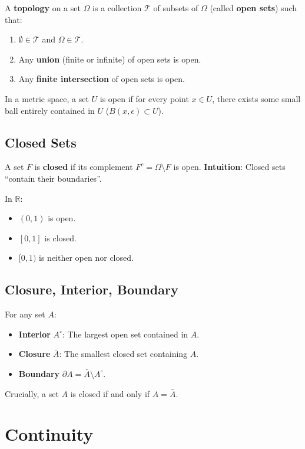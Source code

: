 \begin{definition}[Topology]
A \textbf{topology} on a set $\Omega$ is a collection $\mathcal{T}$ of subsets of $\Omega$ (called \textbf{open sets}) such that:
\begin{enumerate}
    \item $\emptyset \in \mathcal{T}$ and $\Omega \in \mathcal{T}$.
    \item Any \textbf{union} (finite or infinite) of open sets is open.
    \item Any \textbf{finite intersection} of open sets is open.
\end{enumerate}
\end{definition}

In a metric space, a set $U$ is open if for every point $x \in U$, there exists some small ball entirely contained in $U$ ($B(x, \epsilon) \subset U$).

\subsection{Closed Sets}
A set $F$ is \textbf{closed} if its complement $F^c = \Omega \setminus F$ is open.
\textbf{Intuition}: Closed sets ``contain their boundaries''.
\begin{example}
In $\mathbb{R}$:
\begin{itemize}
    \item $(0, 1)$ is open.
    \item $[0, 1]$ is closed.
    \item $[0, 1)$ is neither open nor closed.
\end{itemize}
\end{example}

\subsection{Closure, Interior, Boundary}
For any set $A$:
\begin{itemize}
    \item \textbf{Interior} $A^\circ$: The largest open set contained in $A$.
    \item \textbf{Closure} $\bar{A}$: The smallest closed set containing $A$.
    \item \textbf{Boundary} $\partial A = \bar{A} \setminus A^\circ$.
\end{itemize}
Crucially, a set $A$ is closed if and only if $A = \bar{A}$.

\section{Continuity}

